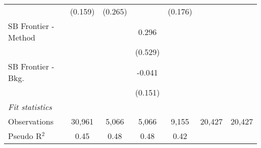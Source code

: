 \begin{tabular}{lcccccc}
                        & (0.159)     & (0.265)      &             & (0.176) &        &   \\   
   SB Frontier - Method &             &              & 0.296       &         &        &   \\   
                        &             &              & (0.529)     &         &        &   \\   
   SB Frontier - Bkg.   &             &              & -0.041      &         &        &   \\   
                        &             &              & (0.151)     &         &        &   \\   
   \midrule
   \emph{Fit statistics}\\
   Observations         & 30,961      & 5,066        & 5,066       & 9,155   & 20,427 & 20,427\\  
   Pseudo R$^2$         & 0.45        & 0.48         & 0.48        & 0.42    &        & \\  
   

\end{tabular}
